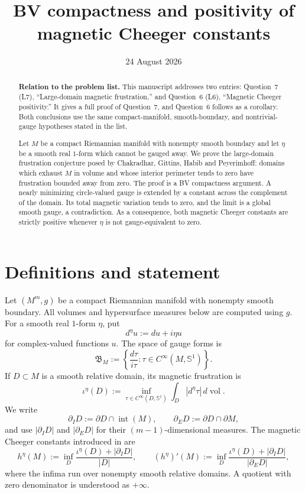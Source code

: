 \documentclass[11pt]{amsart}
\title[BV compactness and magnetic Cheeger constants]
{BV compactness and positivity of magnetic Cheeger constants}
\date{24 August 2026}
\newcommand{\Sph}{\mathbb S^1}
\newcommand{\vol}{\operatorname{vol}}
\newcommand{\interior}{\operatorname{int}}
\newcommand{\Bspace}{\mathfrak B}
\newcommand{\frust}{\iota}
\begin{document}
\begin{abstract}
\textbf{Relation to the problem list.}
This manuscript addresses two entries: Question~7 (L7), ``Large-domain
magnetic frustration,'' and Question~6 (L6), ``Magnetic Cheeger positivity.''
It gives a full proof of Question~7, and Question~6 follows as a corollary.
Both conclusions use the same compact-manifold, smooth-boundary, and
nontrivial-gauge hypotheses stated in the list.

Let $M$ be a compact Riemannian manifold with nonempty smooth boundary and let
$\eta$ be a smooth real $1$-form which cannot be gauged away.  We prove the
large-domain frustration conjecture posed by Chakradhar, Gittins, Habib and
Peyerimhoff: domains which exhaust $M$ in volume and whose interior perimeter
tends to zero have frustration bounded away from zero.  The proof is a BV
compactness argument.  A nearly minimizing circle-valued gauge is extended by
a constant across the complement of the domain.  Its total magnetic variation
tends to zero, and the limit is a global smooth gauge, a contradiction.  As a
consequence, both magnetic Cheeger constants are strictly positive whenever
$\eta$ is not gauge-equivalent to zero.
\end{abstract}

\maketitle

\section{Definitions and statement}

Let $(M^m,g)$ be a compact Riemannian manifold with nonempty smooth boundary.
All volumes and hypersurface measures below are computed using $g$.  For a
smooth real $1$-form $\eta$, put
\[
  d^\eta u:=du+i\eta u
\]
for complex-valued functions $u$.  The space of gauge forms is
\[
  \Bspace_M
  :=\left\{\frac{d\tau}{i\tau}:\tau\in C^\infty(M,\Sph)\right\}.
\]
If $D\subset M$ is a smooth relative domain, its magnetic frustration is
\[
  \frust^\eta(D)
  :=\inf_{\tau\in C^\infty(D,\Sph)}
       \int_D |d^\eta\tau|\,d\vol.
\]
We write
\[
  \partial_I D:=\partial D\cap\interior(M),
  \qquad
  \partial_E D:=\partial D\cap\partial M,
\]
and use $|\partial_I D|$ and $|\partial_E D|$ for their
$(m-1)$-dimensional measures.  The magnetic Cheeger constants introduced in
\cite{CGHP} are
\[
 h^\eta(M)
 :=\inf_D\frac{\frust^\eta(D)+|\partial_I D|}{|D|},
 \qquad
 (h^\eta)'(M)
 :=\inf_D\frac{\frust^\eta(D)+|\partial_I D|}{|\partial_E D|},
\]
where the infima run over nonempty smooth relative domains.  A quotient with
zero denominator is understood as $+\infty$.
\end{document}
